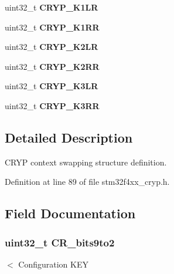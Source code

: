 \begin{DoxyCompactItemize}
\item 
\hypertarget{struct_c_r_y_p___context_a175bb9e15eea5815a08dd93b75c853c1}{uint32\-\_\-t {\bfseries C\-R\-Y\-P\-\_\-\-K1\-L\-R}}\label{struct_c_r_y_p___context_a175bb9e15eea5815a08dd93b75c853c1}

\item 
\hypertarget{struct_c_r_y_p___context_a559714eafa8b64b7effc958f2783ccc0}{uint32\-\_\-t {\bfseries C\-R\-Y\-P\-\_\-\-K1\-R\-R}}\label{struct_c_r_y_p___context_a559714eafa8b64b7effc958f2783ccc0}

\item 
\hypertarget{struct_c_r_y_p___context_a365bea8e99a430251529e02b1d6b528a}{uint32\-\_\-t {\bfseries C\-R\-Y\-P\-\_\-\-K2\-L\-R}}\label{struct_c_r_y_p___context_a365bea8e99a430251529e02b1d6b528a}

\item 
\hypertarget{struct_c_r_y_p___context_a0f66af275122ebfc05a53dd63202f750}{uint32\-\_\-t {\bfseries C\-R\-Y\-P\-\_\-\-K2\-R\-R}}\label{struct_c_r_y_p___context_a0f66af275122ebfc05a53dd63202f750}

\item 
\hypertarget{struct_c_r_y_p___context_ae354e61155f2a1fb93d490329a393b76}{uint32\-\_\-t {\bfseries C\-R\-Y\-P\-\_\-\-K3\-L\-R}}\label{struct_c_r_y_p___context_ae354e61155f2a1fb93d490329a393b76}

\item 
\hypertarget{struct_c_r_y_p___context_a078711953a6ee25f90d81fd86d92a9c2}{uint32\-\_\-t {\bfseries C\-R\-Y\-P\-\_\-\-K3\-R\-R}}\label{struct_c_r_y_p___context_a078711953a6ee25f90d81fd86d92a9c2}

\end{DoxyCompactItemize}


\subsection{Detailed Description}
C\-R\-Y\-P context swapping structure definition. 

Definition at line 89 of file stm32f4xx\-\_\-cryp.\-h.



\subsection{Field Documentation}
\hypertarget{struct_c_r_y_p___context_ae484ce34cd1730e9ffae9ec41365a948}{
\subsubsection[{C\-R\-\_\-bits9to2}]{\setlength{\rightskip}{0pt plus 5cm}uint32\-\_\-t C\-R\-\_\-bits9to2}}\label{struct_c_r_y_p___context_ae484ce34cd1730e9ffae9ec41365a948}
$<$ Configuration K\-E\-Y 


